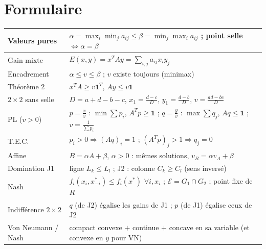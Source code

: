 \documentclass[11pt,a4paper]{article}
\begin{document}
\section{Formulaire}\label{sec:formulaire}
\begin{center}
\renewcommand{\arraystretch}{1.5}
\begin{tabular}{|p{4.2cm}|p{10.8cm}|}
\hline
Valeurs pures & $\alpha=\max_i\min_ja_{ij}\le\beta=\min_j\max_ia_{ij}$ ; point selle $\iff\alpha=\beta$\\\hline
Gain mixte & $E(x,y)=x^TAy=\sum_{i,j}a_{ij}x_iy_j$\\\hline
Encadrement & $\alpha\le v\le\beta$ ; $v$ existe toujours (minimax)\\\hline
Théorème 2 & $x^TA\ge v\mathbf 1^T$, $Ay\le v\mathbf 1$\\\hline
$2\times2$ sans selle & $D=a+d-b-c$, $x_1=\frac{d-c}D$, $y_1=\frac{d-b}D$, $v=\frac{ad-bc}D$\\\hline
PL ($v>0$) & $p=\frac xv$ : $\min\sum p_i$, $A^Tp\ge\mathbf 1$ ; $q=\frac yv$ : $\max\sum q_j$, $Aq\le\mathbf 1$ ; $v=\frac1{\sum p_i}$\\\hline
T.E.C. & $p_i>0\Rightarrow(Aq)_i=1$ ; $(A^Tp)_j>1\Rightarrow q_j=0$\\\hline
Affine & $B=\alpha A+\beta$, $\alpha>0$ : mêmes solutions, $v_B=\alpha v_A+\beta$\\\hline
Domination J1 & ligne $L_k\le L_l$ ; J2 : colonne $C_k\ge C_l$ (sens inversé)\\\hline
Nash & $f_i(x_i,x^*_{-i})\le f_i(x^*)$ $\forall i,x_i$ ; $\mathcal E=G_1\cap G_2$ ; point fixe de $R$\\\hline
Indifférence $2\times2$ & $q$ (de J2) égalise les gains de J1 ; $p$ (de J1) égalise ceux de J2\\\hline
Von Neumann / Nash & compact convexe $+$ continue $+$ concave en sa variable (et convexe en $y$ pour VN)\\\hline
\end{tabular}
\end{center}

\end{document}
